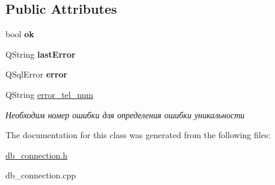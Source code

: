 \subsection*{Public Attributes}
\begin{DoxyCompactItemize}
\item 
\mbox{\label{classdb__connection_a9b90521c20e64bc271ecee3728348113}} 
bool {\bfseries ok}
\item 
\mbox{\label{classdb__connection_ad9875ae67310a3d0f7725560384ef593}} 
Q\+String {\bfseries last\+Error}
\item 
\mbox{\label{classdb__connection_a2d7811d6e7ec3a9ef6c3c3542fd0a805}} 
Q\+Sql\+Error {\bfseries error}
\item 
\mbox{\label{classdb__connection_a731f77218b185b98d849fd157b5170c8}} 
Q\+String \mbox{\hyperlink{classdb__connection_a731f77218b185b98d849fd157b5170c8}{error\+\_\+tel\+\_\+num}}
\begin{DoxyCompactList}\small\item\em Необходим номер ошибки для определения ошибки уникальности \end{DoxyCompactList}\end{DoxyCompactItemize}


The documentation for this class was generated from the following files\+:\begin{DoxyCompactItemize}
\item 
\mbox{\hyperlink{db__connection_8h}{db\+\_\+connection.\+h}}\item 
db\+\_\+connection.\+cpp\end{DoxyCompactItemize}
